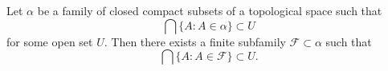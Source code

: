 Let $\alpha$ be a family of closed compact subsets of a topological space such that
$$\bigcap \{A : A \in \alpha\} \subset U$$
for some open set $U$. Then there exists a finite subfamily $\mathcal{F} \subset \alpha$ such that
$$\bigcap \{A : A \in \mathcal{F}\} \subset U.$$

